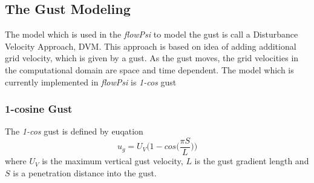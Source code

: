 \subsection{The Gust Modeling}

The model which is used in the \emph{flowPsi} to model the gust is call a 
Disturbance Velocity Approach, DVM. This approach is based on idea of adding 
additional grid velocity, which is given by a gust. As the gust moves, the 
grid velocities in the computational domain are space and time dependent. 
The model which is currently implemented in \emph{flowPsi} is \emph{1-cos} gust

\subsubsection{1-cosine Gust}
The \emph{1-cos} gust is defined by euqation
\begin{equation}
u_g = U_{V}\Bigg(1-cos\Big(\frac{\pi S}{L}\Big)\Bigg)
\end{equation}
where $U_{V}$ is the maximum vertical gust velocity, $L$ is the gust gradient length 
and $S$ is a penetration distance into the gust. 

